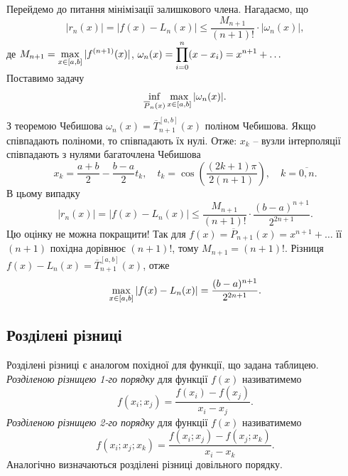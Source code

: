 Перейдемо до питання мінімізації залишкового члена. Нагадаємо, що \begin{equation} \label{eq:6.13} |r_n(x)| = |f(x) - L_n(x)| \le \dfrac{M_{n+1}}{(n+1)!}\cdot|\omega_n(x)|, \end{equation} де $M_{n+1} = \displaystyle\max\limits_{x\in[a,b]} |f^{(n+1)}(x)|$, $\omega_n(x)=\displaystyle\prod\limits_{i=0}^n (x-x_i)=x^{n+1} + \ldots$\\

Поставимо задачу \[ \displaystyle\inf\limits_{\overline{P}_n(x)} \displaystyle\max\limits_{x\in[a,b]} |\omega_n(x)|. \] З теоремою Чебишова $\omega_n(x) = \overline{T}_{n+1}^{[a,b]}(x)$ поліном Чебишова. Якщо співпадають поліноми, то співпадають їх нулі. Отже: $x_k$ -- вузли інтерполяції співпадають з нулями багаточлена Чебишова \[x_k = \dfrac{a+b}{2} - \dfrac{b-a}{2}t_k,\quad t_k = \cos\left(\frac{(2k+1)\pi}{2(n+1)}\right),\quad k=\overline{0,n}.\] В цьому випадку \begin{equation} \label{eq:6.14} |r_n(x)| = |f(x)-L_n(x)| \le \dfrac{M_{n+1}}{(n+1)!} \cdot \dfrac{(b-a)^{n+1}}{2^{2n+1}}. \end{equation} Цю оцінку не можна покращити! Так для $f(x) = \overline{P}_{n+1}(x) = x^{n+1} + \ldots $ її $(n+1)$ похідна дорівнює $(n+1)!$, тому $M_{n+1} = (n+1)!$. Різниця $f(x) - L_n(x) = \overline{T}_{n+1}^{[a,b]}(x)$, отже \[\displaystyle\max\limits_{x\in[a,b]} |f(x) - L_n(x)| = \dfrac{(b-a)^{n+1}}{2^{2n+1}}.\]
\subsection{Розділені різниці}
Розділені різниці є аналогом похідної для функції, що задана таблицею. \\

\textit{Розділеною різницею 1-го порядку} для функції $f(x)$ називатимемо \[ f(x_i; x_j) = \dfrac{f(x_i)-f(x_j)}{x_i-x_j}. \] \textit{Розділеною різницею 2-го порядку} для функції $f(x)$ називатимемо \[ f(x_i; x_j; x_k) = \dfrac{f(x_i;x_j)-f(x_j;x_k)}{x_i-x_k}. \] Аналогічно визначаються розділені різниці довільного порядку. \\

